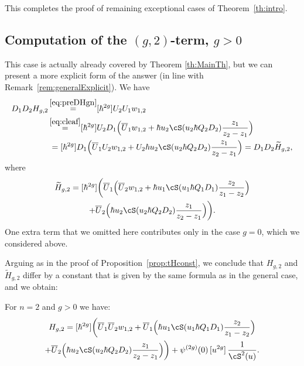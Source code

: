 This completes the proof of remaining exceptional cases of Theorem~\ref{th:intro}.

\subsection{Computation of the \texorpdfstring{$(g,2)$}{(g,2)}-term, \texorpdfstring{$g>0$}{g>0}}\label{sec:g2}
This case is actually already covered by Theorem \ref{th:MainTh}, but we can present a more explicit form of the answer (in line with Remark~\ref{rem:generalExplicit}). We have\vspace*{-3pt}
\begin{align*}
D_1D_2H_{g,2}&\mathop{=}^{\eqref{eq:preDHgn}}[\hbar^{2g}]U_2U_1w_{1,2}\\
&\mathop{=}^{\eqref{eq:cleaf}}
[\hbar^{2g}]U_2
D_1 \Bigl(\overline{U}_1 w_{1,2} + \hbar u_2 \cS(u_2\hbar Q_2D_2)\frac{z_1}{z_2-z_1}\Bigr)
\\
&\,=
[\hbar^{2g}]
D_1 \Bigl(\overline{U}_1 U_2 w_{1,2} + U_2\hbar u_2 \cS(u_2\hbar Q_2D_2)\frac{z_1}{z_2-z_1}\Bigr)
=
D_1 D_2\widetilde H_{g,2},
\end{align*}
where\vspace*{-3pt}
\begin{multline*}
\widetilde H_{g,2}=[\hbar^{2g}]\biggl(\overline{U}_1\Bigl(\overline{U}_2 w_{1,2}
+ \hbar u_1 \cS(u_1\hbar Q_1D_1)\frac{z_2}{z_1-z_2}\Bigr)\\
+\overline{U}_2\Bigl(\hbar u_2 \cS(u_2\hbar Q_2D_2)\frac{z_1}{z_2-z_1}\Bigr) \biggr).
\end{multline*}
One extra term that we omitted here contributes only in the case $g=0$, which we considered above.

Arguing as in the proof of Proposition~\ref{prop:tHconst}, we conclude that $H_{g,2}$ and $\widetilde H_{g,2}$ differ by a constant that is given by the same formula as in the general case, and we obtain:

\begin{proposition} For $n=2$ and $g>0$ we have:
\begin{multline*}
H_{g,2} =[\hbar^{2g}]\biggl(\overline{U}_1\overline{U}_2 w_{1,2}
+ \overline{U}_1\Bigl(\hbar u_1 \cS(u_1\hbar Q_1D_1)\frac{z_2}{z_1-z_2}\Bigr)
\\
+\overline{U}_2\Bigl(\hbar u_2 \cS(u_2\hbar Q_2D_2)\frac{z_1}{z_2-z_1}\Bigr)\biggr)
+ \psi^{(2g)}(0)\,[u^{2g}]\,\frac1{\cS^2(u)}.
\end{multline*}
\end{proposition}

